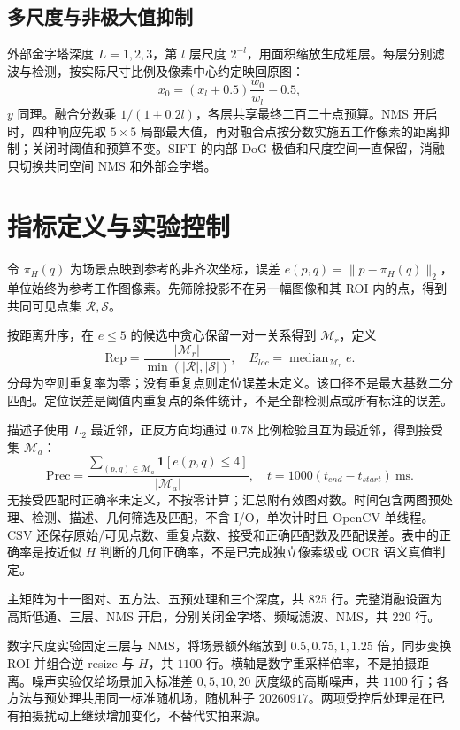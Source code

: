 \subsection{多尺度与非极大值抑制}
外部金字塔深度 $L=1,2,3$，第 $l$ 层尺度 $2^{-l}$，用面积缩放生成粗层。每层分别滤波与检测，按实际尺寸比例及像素中心约定映回原图：
\begin{equation}
x_0=(x_l+0.5)\frac{w_0}{w_l}-0.5,
\end{equation}
$y$ 同理。融合分数乘 $1/(1+0.2l)$，各层共享最终二百二十点预算。NMS 开启时，四种响应先取 $5\times5$ 局部最大值，再对融合点按分数实施五工作像素的距离抑制；关闭时阈值和预算不变。SIFT 的内部 DoG 极值和尺度空间一直保留，消融只切换共同空间 NMS 和外部金字塔。

\section{指标定义与实验控制}
令 $\pi_H(q)$ 为场景点映到参考的非齐次坐标，误差 $e(p,q)=\|p-\pi_H(q)\|_2$，单位始终为参考工作图像素。先筛除投影不在另一幅图像和其 ROI 内的点，得到共同可见点集 $\mathcal R,\mathcal S$。

按距离升序，在 $e\leq5$ 的候选中贪心保留一对一关系得到 $\mathcal M_r$，定义
\begin{equation}
\mathrm{Rep}=\frac{|\mathcal M_r|}{\min(|\mathcal R|,|\mathcal S|)},\quad
E_{loc}=\operatorname{median}_{\mathcal M_r}e.
\end{equation}
分母为空则重复率为零；没有重复点则定位误差未定义。该口径不是最大基数二分匹配。定位误差是阈值内重复点的条件统计，不是全部检测点或所有标注的误差。

描述子使用 $L_2$ 最近邻，正反方向均通过 $0.78$ 比例检验且互为最近邻，得到接受集 $\mathcal M_a$：
\begin{equation}
\mathrm{Prec}=\frac{\sum_{(p,q)\in\mathcal M_a}\mathbf 1[e(p,q)\leq4]}{|\mathcal M_a|},\quad
t=1000(t_{end}-t_{start})\ \mathrm{ms}.
\end{equation}
无接受匹配时正确率未定义，不按零计算；汇总附有效图对数。时间包含两图预处理、检测、描述、几何筛选及匹配，不含 I/O，单次计时且 OpenCV 单线程。CSV 还保存原始/可见点数、重复点数、接受和正确匹配数及匹配误差。表中的正确率是按近似 $H$ 判断的几何正确率，不是已完成独立像素级或 OCR 语义真值判定。

主矩阵为十一图对、五方法、五预处理和三个深度，共 $825$ 行。完整消融设置为高斯低通、三层、NMS 开启，分别关闭金字塔、频域滤波、NMS，共 $220$ 行。

数字尺度实验固定三层与 NMS，将场景额外缩放到 $0.5,0.75,1,1.25$ 倍，同步变换 ROI 并组合逆 resize 与 $H$，共 $1100$ 行。横轴是数字重采样倍率，不是拍摄距离。噪声实验仅给场景加入标准差 $0,5,10,20$ 灰度级的高斯噪声，共 $1100$ 行；各方法与预处理共用同一标准随机场，随机种子 $20260917$。两项受控后处理是在已有拍摄扰动上继续增加变化，不替代实拍来源。

